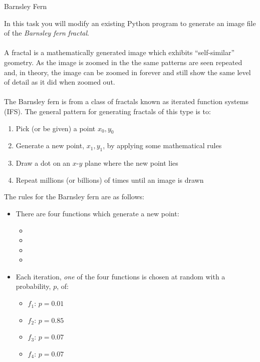 \documentclass{lab}
\begin{document}
\begin{task}{Barnsley Fern}{}

In this task you will modify an existing Python program to generate an image file of the \textit{Barnsley fern} \textit{fractal}.
\\~\\
A fractal is a mathematically generated image which exhibits ``self-similar'' geometry. As the image is zoomed in the the same patterns are seen repeated and, in theory, the image can be zoomed in forever and still show the same level of detail as it did when zoomed out.
\\~\\
The Barnsley fern is from a class of fractals known as iterated function systems (IFS). The general pattern for generating fractals of this type is to:
\begin{enumerate}
\item Pick (or be given) a point $x_0,y_0$
\item Generate a new point, $x_1,y_1$, by applying some mathematical rules
\item Draw a dot on an $x$-$y$ plane where the new point lies
\item Repeat millions (or billions) of times until an image is drawn
\end{enumerate}

The rules for the Barnsley fern are as follows:
\begin{itemize}
\item There are four functions which generate a new point:
	\begin{itemize}
		\item 
		\item 
		\item
		\item
	\end{itemize}
\item Each iteration, \textit{one} of the four functions is chosen at random with a probability, $p$, of:
	\begin{itemize}
		\item $f_1$: $p=0.01$
		\item $f_2$: $p=0.85$
		\item $f_3$: $p=0.07$
		\item $f_4$: $p=0.07$
	\end{itemize}
\end{itemize}

\end{task}
\end{document}
